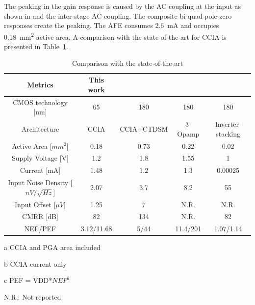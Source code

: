 The peaking in the gain response is caused by the AC coupling at the input as shown in  and the inter-stage AC coupling. The composite bi-quad pole-zero responses create the peaking. The AFE consumes \SI{2.6}{\milli\ampere} and occupies \SI{0.18}{\milli\metre^2} active area. A comparison with the state-of-the-art for CCIA is presented in Table~\ref{SOFA_AFE}.

\begin{table}[!htb]
\begin{adjustbox}{width=\linewidth,center}
\begin{threeparttable}
\centering
\caption{Comparison with the state-of-the-art}
\label{SOFA_AFE}
\begin{tabular}{|c|c|c|c|c|}
\hline
Metrics    & This work & \cite{Jiang-8588386}  &  \cite{Maruyama-7516659}  &  \cite{Shen-8008461}   \\ \hline
CMOS technology {[}nm{]}       & 65   & 180    & 180 & 180     \\ \hline
Architecture & CCIA & CCIA+CTDSM & 3-Opamp & Inverter-stacking \\ \hline
Active Area  {[}$mm^2${]}    & 0.18\tnote{a} & 0.73  & 0.22  & 0.02      \\ \hline
Supply Voltage {[}V{]} & 1.2 & 1.8 & 1.55 & 1      \\ \hline
Current {[}mA{]} & 1.48\tnote{b}  & 1.2    & 1.3      & 0.00025   \\ \hline
Input Noise Density {[}$nV/\sqrt{Hz}${]}  & 2.07 & 3.7  & 8.2  & 55       \\ \hline
Input Offset {[}$\mu V${]}   & 1.25  & 7 & N.R. & N.R. \\ \hline
CMRR  {[}dB{]}     & 82 & 134   & N.R.  & 82 \\ \hline
NEF/PEF\tnote{c} & 3.12/11.68  & 5/44      & 11.4/201  & 1.07/1.14    \\ \hline
\end{tabular}
    \footnoterule
    \begin{tablenotes}
    {\fontsize{6pt}{7pt}\selectfont
     \item [a] CCIA and PGA area included 
      \item [b] CCIA current only
    \item [c] PEF = VDD*$NEF^2$ 
    \item N.R.: Not reported}
\end{tablenotes}
\end{threeparttable}
\end{adjustbox}
\end{table}

